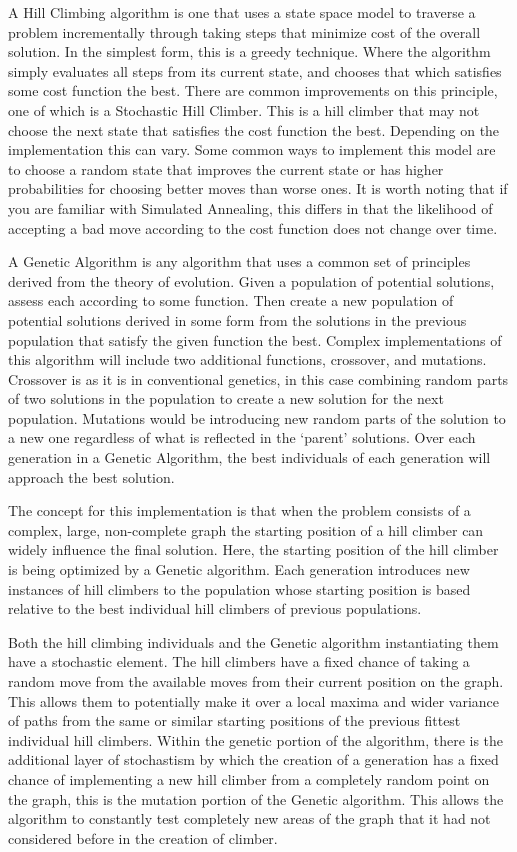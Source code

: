 \documentclass[sigplan,screen]{acmart}
\begin{document}
A Hill Climbing algorithm is one that uses a state space model to traverse a
problem incrementally through taking steps that minimize cost of the overall
solution. In the simplest form, this is a greedy technique. Where the algorithm
simply evaluates all steps from its current state, and chooses that which
satisfies some cost function the best. There are common improvements on this
principle, one of which is a Stochastic Hill Climber. This is a hill climber
that may not choose the next state that satisfies the cost function the best.
Depending on the implementation this can vary. Some common ways to implement
this model are to choose a random state that improves the current state or has
higher probabilities for choosing better moves than worse ones. It is worth
noting that if you are familiar with Simulated Annealing, this differs in that
the likelihood of accepting a bad move according to the cost function does not
change over time.

A Genetic Algorithm is any algorithm that uses a common set of principles
derived from the theory of evolution. Given a population of potential solutions,
assess each according to some function. Then create a new population of
potential solutions derived in some form from the solutions in the previous
population that satisfy the given function the best. Complex implementations of
this algorithm will include two additional functions, crossover, and mutations.
Crossover is as it is in conventional genetics, in this case combining random
parts of two solutions in the population to create a new solution for the next
population. Mutations would be introducing new random parts of the solution to a
new one regardless of what is reflected in the ‘parent’ solutions. Over each
generation in a Genetic Algorithm, the best individuals of each generation will
approach the best solution.

The concept for this implementation is that when the problem consists of a
complex, large, non-complete graph the starting position of a hill climber can
widely influence the final solution. Here, the starting position of the hill
climber is being optimized by a Genetic algorithm. Each generation introduces
new instances of hill climbers to the population whose starting position is
based relative to the best individual hill climbers of previous populations.

Both the hill climbing individuals and the Genetic algorithm instantiating them
have a stochastic element. The hill climbers have a fixed chance of taking a
random move from the available moves from their current position on the graph.
This allows them to potentially make it over a local maxima and wider variance
of paths from the same or similar starting positions of the previous fittest
individual hill climbers. Within the genetic portion of the algorithm, there is
the additional layer of stochastism by which the creation of a generation has a
fixed chance of implementing a new hill climber from a completely random point
on the graph, this is the mutation portion of the Genetic algorithm. This allows
the algorithm to constantly test completely new areas of the graph that it had
not considered before in the creation of climber.
\end{document}
